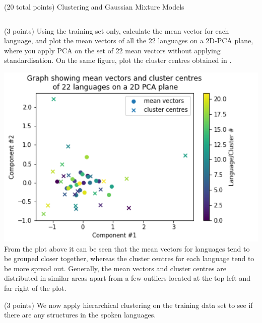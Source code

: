 \documentclass[12pt]{article}
\begin{document}
\begin{question}{(20 total points) Clustering and Gaussian Mixture Models}
\begin{subquestion}
\begin{answerbox}{35em}
\begin{center}
\begin{tabular}{c|c}
    \hline
    \end{tabular}
    \end{center}
      \end{answerbox}
  


   \end{subquestion}
   \begin{subquestion}{(3 points)
       Using the training set only,
       calculate the mean vector for each language, and plot the mean
       vectors of all the 22 languages on a 2D-PCA plane, where you
       apply PCA on the set of 22 mean vectors without applying
       standardisation.  
       On the same figure, plot the cluster centres obtained in .
     } \label{Q3.2}

   

      \begin{answerbox}{35em}
         \includegraphics[width = 1.0\textwidth]{q3_2.png}
         From the plot above it can be seen that the mean vectors for languages tend to be grouped closer together, whereas the cluster centres for each language tend to be more spread out. Generally, the mean vectors and cluster centres are distributed in similar areas apart from a few outliers located at the top left and far right of the plot.
      \end{answerbox}
  


   \end{subquestion}
   \begin{subquestion}{(3 points)
       We now apply hierarchical clustering on the training data set
       to see if there are any structures in the spoken languages.
     } \label{Q3.3}



\end{subquestion}
\end{question}
\end{document}
